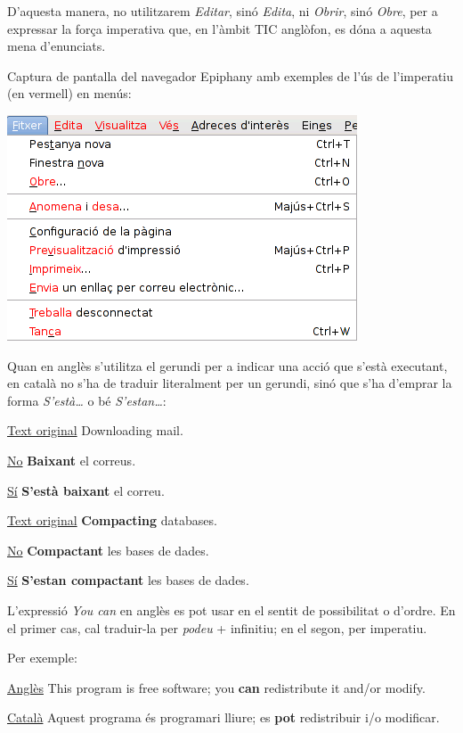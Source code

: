 \documentclass[9pt]{cheatsheet}
\begin{document}
\begin{multicols*}{3}
D'aquesta manera, no utilitzarem \emph{Editar}, sinó \emph{Edita}, ni \emph{Obrir}, sinó \emph{Obre}, per a expressar la força imperativa que, en l'àmbit TIC anglòfon, es dóna a aquesta mena d'enunciats.

Captura de pantalla del navegador Epiphany amb exemples de l'ús de l'imperatiu (en vermell) en menús:

\includegraphics[scale=0.35]{images/epiphany.png}



Quan en anglès s'utilitza el gerundi per a indicar una acció que s'està executant, en català no s'ha de traduir literalment per un gerundi, sinó que s'ha d'emprar la forma \emph{S'està…} o bé \emph{S'estan…}:

\underline {Text original} Downloading mail.

\underline {No} \textbf{Baixant} el correus.

\underline {Sí} \textbf{S'està baixant} el correu.


\underline {Text original} \textbf{Compacting} databases.

\underline {No} \textbf{Compactant} les bases de dades.

\underline {Sí} \textbf{S'estan compactant} les bases de dades.



L'expressió \emph{You can} en anglès es pot usar en el sentit de possibilitat o d'ordre. En el primer cas, cal traduir-la per \emph{podeu} + infinitiu; en el segon, per imperatiu.

Per exemple:

\underline {Anglès} This program is free software; you \textbf{can} redistribute it and/or modify.

\underline {Català} Aquest programa és programari lliure; es \textbf{pot} redistribuir i/o modificar.


\end{multicols*}
\end{document}
